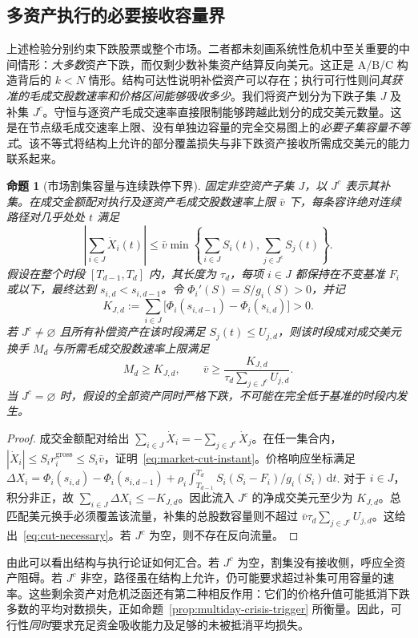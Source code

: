 \documentclass[11pt]{article}
\numberwithin{equation}{section}
\newtheorem{proposition}[theorem]{命题}
\theoremstyle{definition}
\theoremstyle{remark}
\newcommand{\dd}{\,\mathrm{d}}
\begin{document}
\subsection{多资产执行的必要接收容量界}\label{subsec:multiday-cut}
上述检验分别约束下跌股票或整个市场。二者都未刻画系统性危机中至关重要的中间情形：\emph{大多数}资产下跌，而仅剩少数补集资产结算反向美元。这正是 A/B/C 构造背后的 $k<N$ 情形。结构可达性说明补偿资产可以存在；执行可行性则问\emph{其获准的毛成交股数速率和价格区间能够吸收多少}。我们将资产划分为下跌子集 $J$ 及补集 $J^c$。守恒与逐资产毛成交速率直接限制能够跨越此划分的成交美元数量。这是在节点级毛成交速率上限、没有单独边容量的完全交易图上的\emph{必要子集容量不等式}。该不等式将结构上允许的部分覆盖损失与非下跌资产接收所需成交美元的能力联系起来。
\begin{proposition}[市场割集容量与连续跌停下界]\label{prop:market-cut}
固定非空资产子集 $J$，以 $J^c$ 表示其补集。在成交金额配对执行及逐资产毛成交股数速率上限 $\bar v$ 下，每条容许绝对连续路径对几乎处处 $t$ 满足
\begin{equation}\label{eq:market-cut-instant}
\boxed{\left|\sum_{i\in J}\dot X_i(t)\right|\le
\bar v\min\left\{\sum_{i\in J} S_i(t),\sum_{j\in J^c}S_j(t)\right\}.}
\end{equation}
假设在整个时段 $[T_{d-1},T_d]$ 内，其长度为 $\tau_d$，每项 $i\in J$ 都保持在不变基准 $F_i$ 或以下，最终达到 $s_{i,d}<s_{i,d-1}$。令 $\Phi_i'(S)=S/g_i(S)>0$，并记
\begin{equation}\label{eq:cut-required}
K_{J,d}:=\sum_{i\in J}\big[\Phi_i(s_{i,d-1})-\Phi_i(s_{i,d})\big]>0.
\end{equation}
若 $J^c\ne\varnothing$ 且所有补偿资产在该时段满足 $S_j(t)\le U_{j,d}$，则该时段成对成交美元换手 $M_d$ 与所需毛成交股数速率上限满足
\begin{equation}\label{eq:cut-necessary}
\boxed{M_d\ge K_{J,d},\qquad
\bar v\ge\frac{K_{J,d}}{\tau_d\sum_{j\in J^c}U_{j,d}}.}
\end{equation}
当 $J^c=\varnothing$ 时，假设的全部资产同时严格下跌，不可能在完全低于基准的时段内发生。
\end{proposition}
\begin{proof}
成交金额配对给出 $\sum_{i\in J}\dot X_i=-\sum_{j\in J^c}\dot X_j$。在任一集合内，$|\dot X_i|\le S_i r_i^{\mathrm{gross}}\le S_i\bar v$，证明~\eqref{eq:market-cut-instant}。价格响应坐标满足
$\Delta X_i=\Phi_i(s_{i,d})-\Phi_i(s_{i,d-1})+
\rho_i\int_{T_{d-1}}^{T_d}S_i(S_i-F_i)/g_i(S_i)\dd t$.
对于 $i\in J$，积分非正，故 $\sum_{i\in J}\Delta X_i\le-K_{J,d}$。因此流入 $J^c$ 的净成交美元至少为 $K_{J,d}$。总匹配美元换手必须覆盖该流量，补集的总股数容量则不超过 $\bar v\tau_d\sum_{j\in J^c}U_{j,d}$。这给出~\eqref{eq:cut-necessary}。若 $J^c$ 为空，则不存在反向流量。
\end{proof}
由此可以看出结构与执行论证如何汇合。若 $J^c$ 为空，割集没有接收侧，呼应全资产阻碍。若 $J^c$ 非空，路径虽在结构上允许，仍可能要求超过补集可用容量的速率。这些剩余资产对危机泛函还有第二种相反作用：它们的价格升值可能抵消下跌多数的平均对数损失，正如命题~\ref{prop:multiday-crisis-trigger} 所衡量。因此，可行性\emph{同时}要求充足资金吸收能力及足够的未被抵消平均损失。
\end{document}
